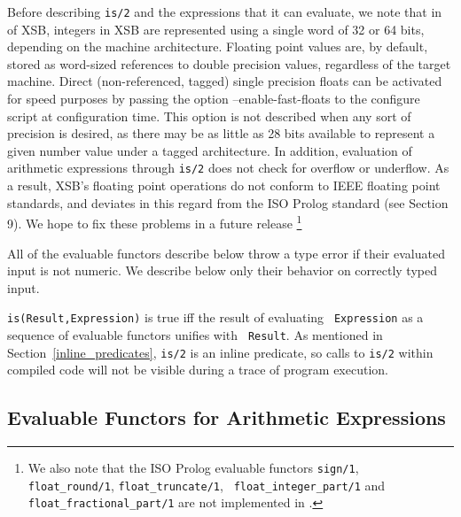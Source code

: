 Before describing {\tt is/2} and the expressions that it can evaluate,
we note that in \version{} of XSB, integers in XSB are represented
using a single word of 32 or 64 bits, depending on the machine
architecture. Floating point values are, by default, stored as
word-sized references to double precision values, regardless of the
target machine. Direct (non-referenced, tagged) single precision
floats can be activated for speed purposes by passing the option
--enable-fast-floats to the configure script at configuration time.
This option is not described when any sort of precision is desired, as
there may be as little as 28 bits available to represent a given
number value under a tagged architecture.  In addition, evaluation of
arithmetic expressions through {\tt is/2} does not check for overflow
or underflow.  As a result, XSB's floating point operations do not
conform to IEEE floating point standards, and deviates in this regard
from the ISO Prolog standard (see \cite{ISO-Prolog} Section 9).  We
hope to fix these problems in a future release \footnote{We also note
  that the ISO Prolog evaluable functors {\tt sign/1}, {\tt
    float\_round/1}, {\tt float\_truncate/1}, {\tt
    float\_integer\_part/1} and {\tt float\_fractional\_part/1} are
  not implemented in \version .}

All of the evaluable functors describe below throw a type error if
their evaluated input is not numeric.  We describe below only their
behavior on correctly typed input.

\begin{description}
{\tt is(Result,Expression)} is true iff the result of evaluating {\tt
Expression} as a sequence of evaluable functors unifies with {\tt
Result}.  As mentioned in Section~\ref{inline_predicates}, {\tt is/2}
is an inline predicate, so calls to {\tt is/2} within compiled code
will not be visible during a trace of program execution.
\end{description}

\subsection{Evaluable Functors for Arithmetic Expressions}

